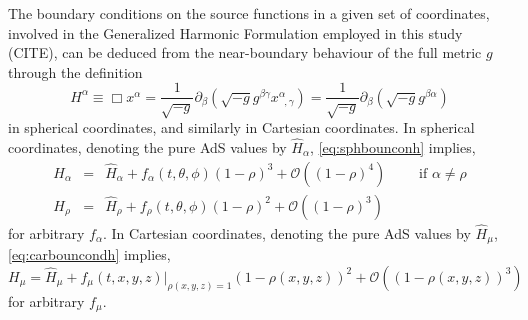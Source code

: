 \documentclass[a4paper,11pt]{article}
\numberwithin{equation}{section}
\begin{document}
The boundary conditions on the source functions in a given set of coordinates, involved in the Generalized Harmonic Formulation employed in this study (CITE), can be deduced from the near-boundary behaviour of the full metric $g$ through the definition 
\begin{equation}\label{eq:defsoufunsph}
H^\alpha \equiv \Box x^\alpha = \frac{1}{\sqrt{-g}}\partial_\beta (\sqrt{-g}g^{\beta\gamma}x^\alpha_{\;\;,\gamma})=\frac{1}{\sqrt{-g}}\partial_\beta (\sqrt{-g}g^{\beta\alpha})
\end{equation}
in spherical coordinates, and similarly in Cartesian coordinates. 
In spherical coordinates, denoting the pure AdS values by $\hat{H}_\alpha$, \eqref{eq:sphbounconh} implies,
\begin{eqnarray}\label{eq:sphbouncondsoufunc}
H_\alpha&=&\hat{H}_\alpha+f_\alpha(t,\theta,\phi)(1-\rho)^3+\mathcal{O}((1-\rho)^4) \qquad \textrm{ if $\alpha\neq\rho$} \\ \nonumber
H_\rho&=&\hat{H}_\rho+f_\rho(t,\theta,\phi)(1-\rho)^2+\mathcal{O}((1-\rho)^3)
\end{eqnarray}
for arbitrary $f_\alpha$.
In Cartesian coordinates,  denoting the pure AdS values by $\hat{H}_\mu$, \eqref{eq:carbouncondh} implies,
\begin{equation}\label{eq:carbouncondsoufun}
H_\mu=\hat{H}_\mu+f_\mu(t,x,y,z)|_{\rho(x,y,z)=1}(1-\rho(x,y,z))^2+\mathcal{O}((1-\rho(x,y,z))^3)
\end{equation}
for arbitrary $f_\mu$.




\end{document}
